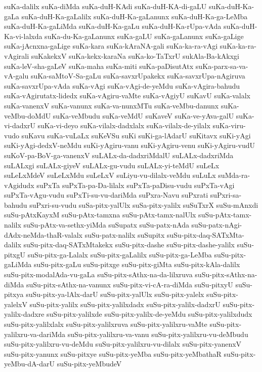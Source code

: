 {suKa-dalilx
suKa-diMda
suKa-duH-KAdi
suKa-duH-KA-di-gaLU
suKa-duH-Ka-gaLa
suKa-duH-Ka-gaLalilx
suKa-duH-Ka-gaLanunx
suKa-duH-Ka-ga-LeMba
suKa-duH-Ka-gaLiMda
suKa-duH-Ka-gaLu
suKa-duH-Ka-rUpa-vAda
suKa-duH-Ka-vi-lalxda
suKa-du-Ka-gaLanunx
suKa-gaLU
suKa-gaLanunx
suKa-gaLige
suKa-jAcnxna-gaLige
suKa-kara
suKa-kAraNA-gali
suKa-ka-ra-vAgi
suKa-ka-ra-vAgirali
suKakekxV
suKa-kekx-karaNa
suKa-ko-TaTxrU
sukAla-Ba-kAkxgi
suKa-leV-sha-gaLeV
suKa-maha
suKa-miti
suKa-paDisutAtx
suKa-parx-sa-va-vA-galu
suKa-saMtoV-Sa-gaLu
suKa-savxrUpakekx
suKa-savxrUpa-nAgiruva
suKa-savxrUpa-vAda
suKa-vAgi
suKa-vAgi-de-yeMdu
suKa-vAgira-bahudu
suKa-vAgirutatx-lidedx
suKa-vAgiru-vaMte
suKa-vAgiyU
suKavU
suKa-valalx
suKa-vanenxV
suKa-vanunx
suKa-va-nunxMTu
suKa-veMbu-danunx
suKa-veMbu-doMdU
suKa-veMbudu
suKa-veMdU
suKaveV
suKa-ve-yAva-galU
suKa-vi-dadxrU
suKa-vi-deyo
suKa-vilalx-dadxlalx
suKa-vilalx-de-yilalx
suKa-viru-vudo
suKavu
suKa-vuLaLx
suKeVSu
suKi
suKi-ga-lAdarU
suKitavx
suKi-yAgi
suKi-yAgi-dedxV-neMdu
suKi-yAgiru-vanu
suKi-yAgiru-venu
suKi-yAgiru-vudU
suKoV-pa-BoV-ga-vanenxV
suLALx-da-dadxriMdalU
suLALx-dadxriMda
suLALxgi
suLALx-giyeV
suLALx-gu-vudu
suLALx-yi-teMdU
suLeLx
suLeLxMdeV
suLeLxMdu
suLeLxV
suLiyu-vu-dilalx-veMdu
suLuLx
suMda-ra-vAgidudx
suPxTa
suPxTa-pa-Da-lilalx
suPxTa-paDisu-vudu
suPxTa-vAgi
suPxTa-vAgu-vudu
suPxTi-su-vu-dariMda
suPxra-Navu
suPxrati
suPxri-sa-bahudu
suPxri-su-vudu
suSa-pitx-yalUlx
suSa-pitx-yalilx
suSuTxrX
suSu-mAnxdi
suSu-pAtxKayxM
suSu-pAtx-tamxna
suSu-pAtx-tamx-nalUlx
suSu-pAtx-tamx-nalilx
suSu-pAtx-va-sethx-yiMda
suSupatx
suSu-patx-nAda
suSu-patx-nAgi-dAdx-neMda-thaR-valalx
suSu-patx-nalilx
suSupitx
suSu-pitx-daq-SATxMta-dalilx
suSu-pitx-daq-SATxMtakekx
suSu-pitx-dashe
suSu-pitx-dashe-yalilx
suSu-pitxgU
suSu-pitx-ga-Lalalx
suSu-pitx-gaLalilx
suSu-pitx-ga-LeMba
suSu-pitx-gaLiMda
suSu-pitx-gaLu
suSu-pitxge
suSu-pitx-giMta
suSu-pitx-kAla-dalilx
suSu-pitx-modalAda-vu-gaLa
suSu-pitx-sAthx-na-da-lilxruva
suSu-pitx-sAthx-na-diMda
suSu-pitx-sAthx-na-vanunx
suSu-pitx-vi-cA-ra-diMda
suSu-pitxyU
suSu-pitxya
suSu-pitx-ya-lAlx-darU
suSu-pitx-yalUlx
suSu-pitx-yalelx
suSu-pitx-yalelxV
suSu-pitx-yalilx
suSu-pitx-yalilxdadx
suSu-pitx-yalilx-dadxrU
suSu-pitx-yalilx-dadxre
suSu-pitx-yalilxde
suSu-pitx-yalilx-de-yeMdu
suSu-pitx-yalilxdudx
suSu-pitx-yalilxlalx
suSu-pitx-yalilxruva
suSu-pitx-yalilxru-vaMte
suSu-pitx-yalilxru-va-dariMda
suSu-pitx-yalilxru-va-vanu
suSu-pitx-yalilxru-vu-deMbudu
suSu-pitx-yalilxru-vu-deMdu
suSu-pitx-yalilxru-vu-dilalx
suSu-pitx-yanenxV
suSu-pitx-yanunx
suSu-pitxye
suSu-pitx-yeMba
suSu-pitx-yeMbathaR
suSu-pitx-yeMbu-dA-darU
suSu-pitx-yeMbudeV
}
